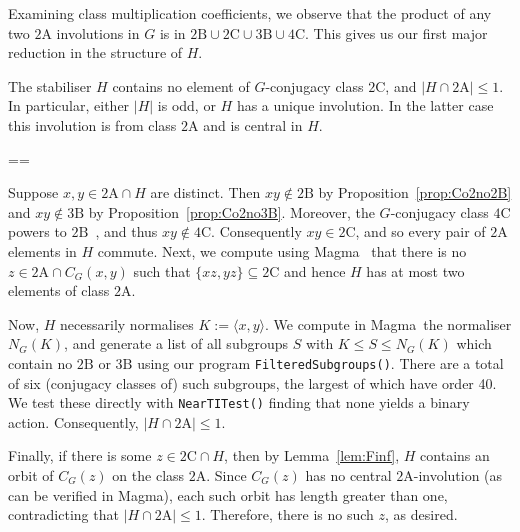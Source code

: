 \documentclass[11pt, a4paper]{amsart}
\makeatletter
\newcommand{\magma}{{\sc Magma}}
\renewcommand{\proofname}{Proof}
\renewenvironment{proof}[1][\proofname]{\par
  \pushQED{\qed}  \normalfont \partopsep=\z@skip \topsep=\z@skip
  \trivlist
  \item[\hskip\labelsep
        \scshape
    #1\@addpunct{.}]\ignorespaces
}{  \popQED\endtrivlist\@endpefalse
}
\makeatother
\begin{document}
Examining class multiplication coefficients, we observe that the product of any two $\mathrm{2A}$ involutions in $G$ is in $\mathrm{2B}\cup\mathrm{2C}\cup\mathrm{3B}\cup\mathrm{4C}$.  This gives us our first major reduction in the structure of $H$.
\begin{cor}\label{cor:Co2cent2A}
    The stabiliser $H$ contains no element of $G$-conjugacy class $\mathrm{2C}$, and $|H\cap \mathrm{2A}|\leq 1$.     In particular, either $|H|$ is odd, or $H$ has a unique involution. In the latter case this involution is from class $\mathrm{2A}$ and is central in $H$.
\end{cor}
\begin{proof}
    Suppose $x,y\in\mathrm{2A}\cap H$ are distinct. Then $xy\not\in \mathrm{2B}$ by Proposition~\ref{prop:Co2no2B} and $xy\not\in \mathrm{3B}$ by Proposition~\ref{prop:Co2no3B}. Moreover, the $G$-conjugacy class $\mathrm{4C}$ powers to $\mathrm{2B}$~\cite{atlas}, and thus $xy\not\in \mathrm{4C}$. Consequently $xy\in\mathrm{2C}$, and so every pair of $\mathrm{2A}$ elements in $H$ commute. Next, we compute using \magma~\cite{magma} that there is no $z\in \mathrm{2A}\cap C_G(x,y)$ such that $\{xz,yz\}\subseteq \mathrm{2C}$ and hence $H$ has at most two elements of class $2\mathrm{A}$.

    Now, $H$ necessarily normalises $K:=\langle x,y\rangle$. We compute in \magma~the normaliser $N_G(K)$, and generate a list of all subgroups $S$ with $K\leq S\leq N_G(K)$ which contain no $\mathrm{2B}$ or $\mathrm{3B}$ using our program {\tt FilteredSubgroups()}. There are a total of six (conjugacy classes of) such subgroups, the largest of which have order 40. We test these directly with {\tt{NearTITest()}} finding that none yields a binary action. Consequently, $|H\cap \mathrm{2A}|\leq 1$.

    Finally, if there is some $ z\in\mathrm{2C}\cap H$, then by Lemma~\ref{lem:Finf}, $H$ contains an orbit of $C_G(z)$ on the class $\mathrm{2A}$. Since $C_G(z)$ has no central $\mathrm{2A}$-involution (as can be verified in \magma), each such orbit has length greater than one, contradicting that $|H\cap \mathrm{2A}|\leq 1$. Therefore, there is no such $z$, as desired.
    \end{proof}
\end{document}
